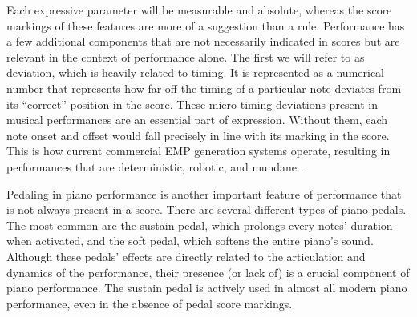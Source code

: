 Each expressive parameter will be measurable and absolute, whereas the score markings of these features are more of a suggestion than a rule. Performance has a few additional components that are not necessarily indicated in scores but are relevant in the context of performance alone. The first we will refer to as deviation, which is heavily related to timing. It is represented as a numerical number that represents how far off the timing of a particular note deviates from its ``correct'' position in the score. These micro-timing deviations present in musical performances are an essential part of expression. Without them, each note onset and offset would fall precisely in line with its marking in the score. This is how current commercial EMP generation systems operate, resulting in performances that are deterministic, robotic, and mundane . 

Pedaling in piano performance is another important feature of performance that is not always present in a score. There are several different types of piano pedals. The most common are the sustain pedal, which prolongs every notes' duration when activated, and the soft pedal, which softens the entire piano's sound. Although these pedals' effects are directly related to the articulation and dynamics of the performance, their presence (or lack of) is a crucial component of piano performance. The sustain pedal is actively used in almost all modern piano performance, even in the absence of pedal score markings. 


